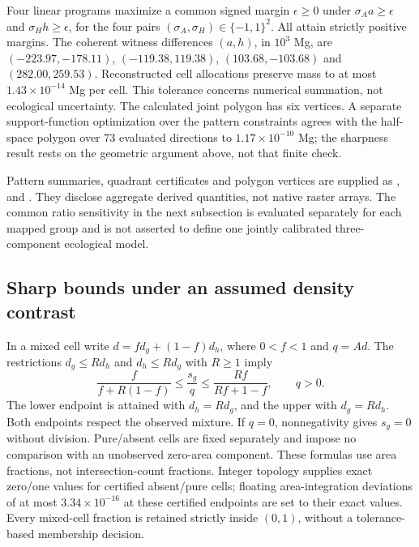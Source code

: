 Four linear programs maximize a common signed margin $\epsilon\ge0$ under $\sigma_A a\ge\epsilon$ and $\sigma_H h\ge\epsilon$, for the four pairs $(\sigma_A,\sigma_H)\in\{-1,1\}^2$. All attain strictly positive margins. The coherent witness differences $(a,h)$, in $10^3$ Mg, are $(-223.97,-178.11)$, $(-119.38,119.38)$, $(103.68,-103.68)$ and $(282.00,259.53)$. Reconstructed cell allocations preserve mass to at most $1.43\times10^{-14}$ Mg per cell. This tolerance concerns numerical summation, not ecological uncertainty. The calculated joint polygon has six vertices. A separate support-function optimization over the pattern constraints agrees with the half-space polygon over 73 evaluated directions to $1.17\times10^{-10}$ Mg; the sharpness result rests on the geometric argument above, not that finite check.

Pattern summaries, quadrant certificates and polygon vertices are supplied as ,  and . They disclose aggregate derived quantities, not native raster arrays. The common ratio sensitivity in the next subsection is evaluated separately for each mapped group and is not asserted to define one jointly calibrated three-component ecological model.

\subsection{Sharp bounds under an assumed density contrast}
In a mixed cell write $d=f d_g+(1-f)d_h$, where $0<f<1$ and $q=Ad$. The restrictions $d_g\le R d_h$ and $d_h\le R d_g$ with $R\ge1$ imply
\[
\frac{f}{f+R(1-f)}\le\frac{s_g}{q}\le\frac{Rf}{Rf+1-f},\qquad q>0.
\]
The lower endpoint is attained with $d_h=R d_g$, and the upper with $d_g=R d_h$. Both endpoints respect the observed mixture. If $q=0$, nonnegativity gives $s_g=0$ without division. Pure/absent cells are fixed separately and impose no comparison with an unobserved zero-area component. These formulas use area fractions, not intersection-count fractions. Integer topology supplies exact zero/one values for certified absent/pure cells; floating area-integration deviations of at most $3.34\times10^{-16}$ at these certified endpoints are set to their exact values. Every mixed-cell fraction is retained strictly inside $(0,1)$, without a tolerance-based membership decision.


